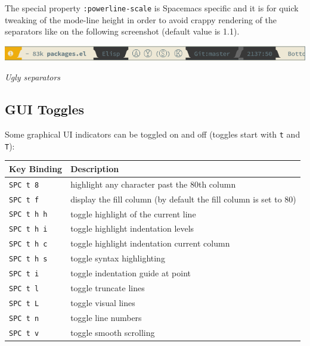 \documentclass[11pt]{article}
\begin{document}
The special property \texttt{:powerline-scale} is Spacemacs specific and it is for
quick tweaking of the mode-line height in order to avoid crappy rendering of the
separators like on the following screenshot (default value is 1.1).

\begin{center}
\includegraphics[width=.9\linewidth]{img/crappy-powerline-separators.png}
\end{center}
\emph{Ugly separators}

\subsection{GUI Toggles}
\label{sec:orgc68c68f}
Some graphical UI indicators can be toggled on and off (toggles start with \texttt{t}
and \texttt{T}):

\begin{center}
\begin{tabular}{ll}
Key Binding & Description\\
\hline
\texttt{SPC t 8} & highlight any character past the 80th column\\
\texttt{SPC t f} & display the fill column (by default the fill column is set to 80)\\
\texttt{SPC t h h} & toggle highlight of the current line\\
\texttt{SPC t h i} & toggle highlight indentation levels\\
\texttt{SPC t h c} & toggle highlight indentation current column\\
\texttt{SPC t h s} & toggle syntax highlighting\\
\texttt{SPC t i} & toggle indentation guide at point\\
\texttt{SPC t l} & toggle truncate lines\\
\texttt{SPC t L} & toggle visual lines\\
\texttt{SPC t n} & toggle line numbers\\
\texttt{SPC t v} & toggle smooth scrolling\\
\end{tabular}
\end{center}
\end{document}
